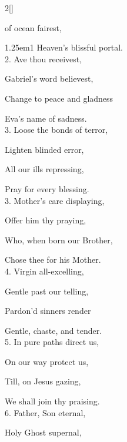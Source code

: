 \begin{paracol}{2}[]
\sloppy

\firstEvensong


\vspace{-1\baselineskip}

\firstEvensongHymn\label{BVMEvensong}

 of ocean fairest,



\begin{hangparas}{1.25em}{1}
Heaven's blissful portal.\\

2. Ave thou receivest,

Gabriel's word believest,

Change to peace and gladness

Eva's name of sadness.\\

3. Loose the bonds of terror,

Lighten blinded error,

All our ills repressing,

Pray for every blessing.\\

3. Mother's care displaying,

Offer him thy praying,

Who, when born our Brother,

Chose thee for his Mother.\\

4. Virgin all-excelling,

Gentle past our telling,

Pardon'd sinners render

Gentle, chaste, and tender.\\

5. In pure paths direct us,

On our way protect us,

Till, on Jesus gazing,

We shall join thy praising.\\

6. Father, Son eternal,

Holy Ghost supernal,


\end{hangparas}
\end{paracol}
